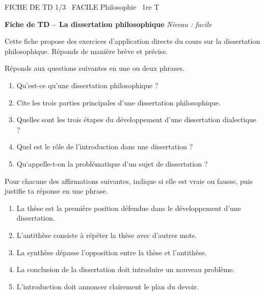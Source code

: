 \documentclass[11pt]{article}
\begin{document}
\begin{tcolorbox}[enhanced,colback=popink,colframe=popink,arc=10pt,boxrule=0pt,left=12pt,right=12pt,top=9pt,bottom=9pt]
{\color{white}\popxbold\small FICHE DE TD 1/3 \textbullet\ FACILE \hfill Philosophie \textbullet\ 1re T\par}
\end{tcolorbox}
\vspace{4pt}
\textbf{Fiche de TD -- La dissertation philosophique} \hfill \textit{Niveau : facile}

Cette fiche propose des exercices d'application directe du cours sur la dissertation philosophique. Réponds de manière brève et précise.

\begin{exercice}
Réponds aux questions suivantes en une ou deux phrases.
\begin{enumerate}
\item Qu'est-ce qu'une dissertation philosophique ?
\item Cite les trois parties principales d'une dissertation philosophique.
\item Quelles sont les trois étapes du développement d'une dissertation dialectique ?
\item Quel est le rôle de l'introduction dans une dissertation ?
\item Qu'appelle-t-on la \og problématique \fg{} d'un sujet de dissertation ?
\end{enumerate}
\end{exercice}

\begin{exercice}
Pour chacune des affirmations suivantes, indique si elle est vraie ou fausse, puis justifie ta réponse en une phrase.
\begin{enumerate}
\item La thèse est la première position défendue dans le développement d'une dissertation.
\item L'antithèse consiste à répéter la thèse avec d'autres mots.
\item La synthèse dépasse l'opposition entre la thèse et l'antithèse.
\item La conclusion de la dissertation doit introduire un nouveau problème.
\item L'introduction doit annoncer clairement le plan du devoir.
\end{enumerate}
\end{exercice}
\end{document}
